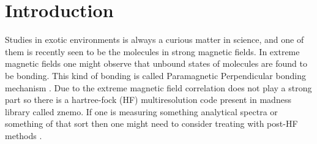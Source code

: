 \section{Introduction}
Studies in exotic environments is always a curious matter in science, and one of them is recently seen to be the molecules in strong magnetic fields. In extreme magnetic fields one might observe that unbound states of molecules are found to be bonding. This kind of bonding is called Paramagnetic Perpendicular bonding mechanism \cite{langeParamagneticBondingMechanism2012}. Due to the extreme magnetic field correlation\cite{langeParamagneticBondingMechanism2012} does not play a strong part so there is a hartree-fock (HF) multiresolution code present in madness library called znemo\cite{bischoffStructureMathrmMolecule2020}. If one is measuring something analytical spectra or something of that sort then one might need to consider treating with post-HF methods \cite{stopkowiczPerspectiveCoupledCluster2018}.